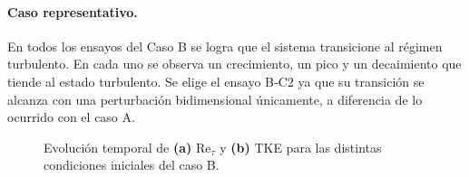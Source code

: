 \paragraph{Caso representativo.} En todos los ensayos del Caso B se logra que el sistema transicione al régimen turbulento. En cada uno se observa un crecimiento, un pico y un decaimiento que tiende al estado turbulento. Se elige el ensayo B‑C2 ya que su transición se alcanza con una perturbación bidimensional  únicamente, a diferencia de lo ocurrido con el caso A.   

\begin{table}[H]
\centering
\caption{Parámetros de las condiciones iniciales para el caso B (Re$_o$ = 5000, Pr = 0.71, Ri$_b$ = 1.06).}
\label{tab:grupo2}
\end{table}

\begin{figure}[H]
  \centering  

  \caption{Evolución temporal de \textbf{(a)} Re$_{\tau}$ y \textbf{(b)} TKE para las distintas condiciones iniciales del caso B.}
  \label{fig:case-B-Re5000-Pr071}
\end{figure}

